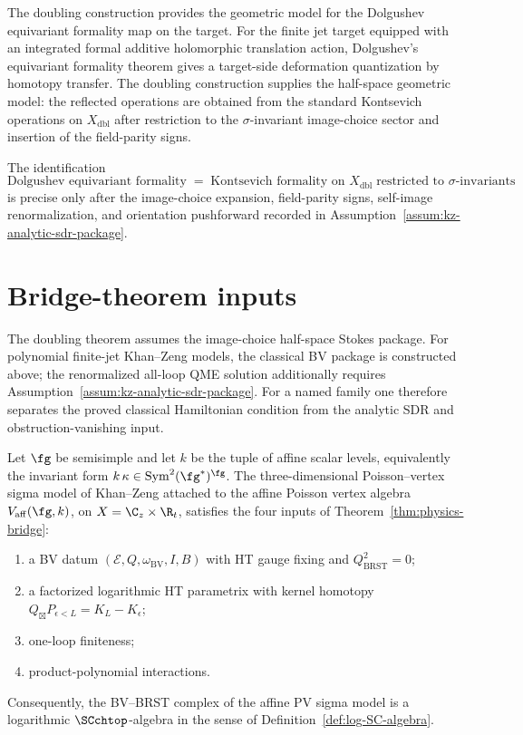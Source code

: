 \begin{remark}
The doubling construction provides the geometric model for the
Dolgushev equivariant formality map on the target. For the finite
jet target equipped with an integrated formal additive holomorphic
translation action, Dolgushev's equivariant formality theorem gives a
target-side deformation quantization by homotopy transfer. The
doubling construction supplies the half-space geometric model: the
reflected operations are obtained from the standard Kontsevich
operations on $X_{\mathrm{dbl}}$ after restriction to the
$\sigma$-invariant image-choice sector and insertion of the
field-parity signs.

The identification
\[
\text{Dolgushev equivariant formality}
\;=\;
\text{Kontsevich formality on }X_{\mathrm{dbl}}
\;\text{restricted to }\sigma\text{-invariants}
\]
is precise only after the image-choice expansion, field-parity signs,
self-image renormalization, and orientation pushforward recorded in
Assumption~\ref{assum:kz-analytic-sdr-package}.
\end{remark}

\section{Bridge-theorem inputs}
\label{sec:bridge-theorem-inputs}

The doubling theorem assumes the image-choice half-space
Stokes package. For polynomial finite-jet Khan--Zeng models, the
classical BV package is constructed above; the renormalized all-loop
QME solution additionally requires
Assumption~\ref{assum:kz-analytic-sdr-package}. For a named family
one therefore separates the proved classical Hamiltonian condition
from the analytic SDR and obstruction-vanishing input.

\begin{proposition}%
\label{prop:affine-is-log-SC}
Let $\fg$ be semisimple and let $k$ be the tuple of affine scalar
levels, equivalently the invariant form
$k\,\kappa\in\mathrm{Sym}^2(\fg^*)^\fg$. The three-dimensional
Poisson--vertex sigma model of Khan--Zeng attached to the affine
Poisson vertex algebra $V_{\mathrm{aff}}(\fg, k)$, on
$X = \C_z \times \R_t$, satisfies the four inputs of
Theorem~\textup{\ref{thm:physics-bridge}}:
\begin{enumerate}[label=\textup{(\alph*)}]
\item a BV datum $(\mathcal E,Q,\omega_{\mathrm{BV}},I,B)$ with HT gauge fixing and $Q_{\mathrm{BRST}}^2 = 0$;
\item a factorized logarithmic HT parametrix with kernel homotopy
$Q_{\boxtimes}P_{\epsilon<L}=K_L-K_\epsilon$;
\item one-loop finiteness;
\item product-polynomial interactions.
\end{enumerate}
Consequently, the BV--BRST complex of the affine PV sigma model is a
logarithmic $\SCchtop$-algebra in the sense of
Definition~\textup{\ref{def:log-SC-algebra}}.
\end{proposition}

